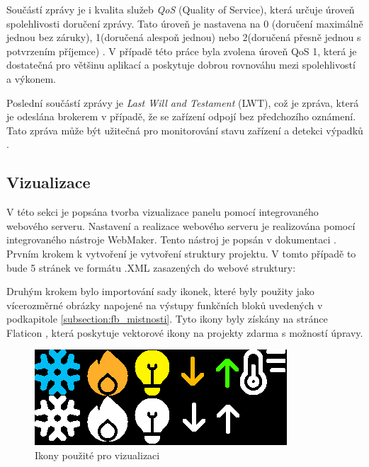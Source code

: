 \noindent Součástí zprávy je i kvalita služeb \textit{QoS} (Quality of Service), která určuje úroveň spolehlivosti doručení zprávy. Tato úroveň je nastavena na 0 (doručení maximálně jednou bez záruky), 1(doručená alespoň jednou) nebo 2(doručená přesně jednou s potvrzením příjemce) \cite{MQTTEsentials}. V případě této práce byla zvolena úroveň QoS 1, která je dostatečná pro většinu aplikací a poskytuje dobrou rovnováhu mezi spolehlivostí a výkonem. 

Poslední součástí zprávy je \textit{Last Will and Testament} (LWT), což je zpráva, která je odeslána brokerem v případě, že se zařízení odpojí bez předchozího oznámení. Tato zpráva může být užitečná pro monitorování stavu zařízení a detekci výpadků \cite{MQTTEssentials}.




\subsection{Vizualizace}
V této sekci je popsána tvorba vizualizace panelu pomocí integrovaného webového serveru. Nastavení a realizace webového serveru je realizována pomocí integrovaného nástroje WebMaker. Tento nástroj je popsán v dokumentaci \cite{WebMaker}.
Prvním krokem k vytvoření je vytvoření struktury projektu. V tomto případě to bude 5 stránek ve formátu .XML zasazených do webové struktury: \newline

\vspace{0.3cm}
Druhým krokem bylo importování sady ikonek, které byly použity jako vícerozměrné obrázky napojené na výstupy funkčních bloků uvedených v podkapitole \ref{subsection:fb_mistnosti}. Tyto ikony byly získány na stránce Flaticon \cite{Flaticon}, která poskytuje vektorové ikony na projekty zdarma s možností úpravy. 


\begin{figure}[!ht]
    \begin{center}
        \includegraphics[scale=0.6]{obrazky/Ikonky.png}
    \end{center}
    \caption[Ikony použité pro vizualizaci]{Ikony použité pro vizualizaci}
    \label{fig:ikony}
\end{figure}


